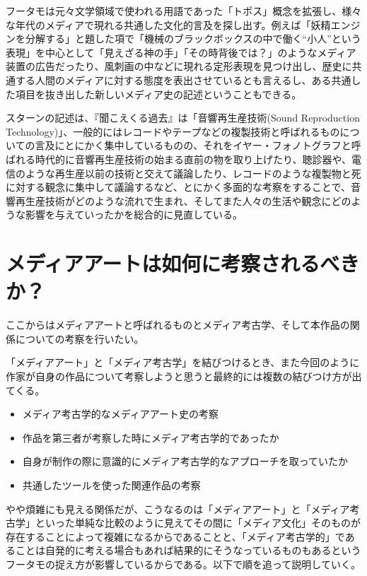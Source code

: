 \documentclass[a4paper,report]{jsbook}
\begin{document}
フータモは元々文学領域で使われる用語であった「トポス」概念を拡張し、様々な年代のメディアで現れる共通した文化的言及を探し出す。例えば「妖精エンジンを分解する」と題した項で「機械のブラックボックスの中で働く``小人''という表現」を中心として「見えざる神の手」「その時背後では？」のようなメディア装置の広告だったり、風刺画の中などに現れる定形表現を見つけ出し、歴史に共通する人間のメディアに対する態度を表出させているとも言えるし、ある共通した項目を抜き出した新しいメディア史の記述ということもできる。

スターンの記述は、『聞こえくる過去』は「音響再生産技術(Sound
Reproduction
Technology)」、一般的にはレコードやテープなどの複製技術と呼ばれるものについての言及にとにかく集中しているものの、それをイヤー・フォノトグラフと呼ばれる時代的に音響再生産技術の始まる直前の物を取り上げたり、聴診器や、電信のような再生産以前の技術と交えて議論したり、レコードのような複製物と死に対する観念に集中して議論するなど、とにかく多面的な考察をすることで、音響再生産技術がどのような流れで生まれ、そしてまた人々の生活や観念にどのような影響を与えていったかを総合的に見直している。

\section{メディアアートは如何に考察されるべきか？}\label{ux30e1ux30c7ux30a3ux30a2ux30a2ux30fcux30c8ux306fux5982ux4f55ux306bux8003ux5bdfux3055ux308cux308bux3079ux304dux304b}

ここからはメディアアートと呼ばれるものとメディア考古学、そして本作品の関係についての考察を行いたい。

「メディアアート」と「メディア考古学」を結びつけるとき、また今回のように作家が自身の作品について考察しようと思うと最終的には複数の結びつけ方が出てくる。

\begin{itemize}
\tightlist
\item
  メディア考古学的なメディアアート史の考察
\item
  作品を第三者が考察した時にメディア考古学的であったか
\item
  自身が制作の際に意識的にメディア考古学的なアプローチを取っていたか
\item
  共通したツールを使った関連作品の考察
\end{itemize}

やや煩雑にも見える関係だが、こうなるのは「メディアアート」と「メディア考古学」といった単純な比較のように見えてその間に「メディア文化」そのものが存在することによって複雑になるからであることと、「メディア考古学的」であることは自発的に考える場合もあれば結果的にそうなっているものもあるというフータモの捉え方が影響しているからである。以下で順を追って説明していく。
\end{document}
